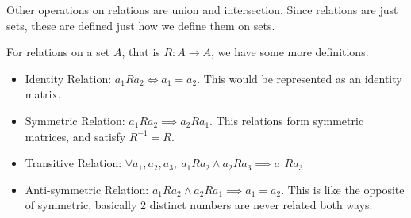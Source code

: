 \documentclass[a4paper,10pt]{article}
\theoremstyle{definition} %
\begin{document}
    Other operations on relations are union and intersection. Since relations are just sets, these are
    defined just how we define them on sets.
    
    For relations on a set $A$, that is $R:A \rightarrow A$, we have some more definitions.
    \begin{itemize}
        \item Identity Relation: $a_1Ra_2 \iff a_1 = a_2$. This would be represented as an identity matrix.
        \item Symmetric Relation: $a_1Ra_2 \implies a_2Ra_1$. This relations form symmetric matrices, and satisfy $R^{-1} = R$.
        \item Transitive Relation: $\forall a_1,a_2,a_3, \ a_1Ra_2 \land a_2Ra_3 \implies a_1Ra_3$
        \item Anti-symmetric Relation: $a_1Ra_2 \land a_2Ra_1 \implies a_1 = a_2$. This is like the opposite of symmetric, 
        basically 2 distinct numbers are never related both ways.
    \end{itemize}
\end{document}
